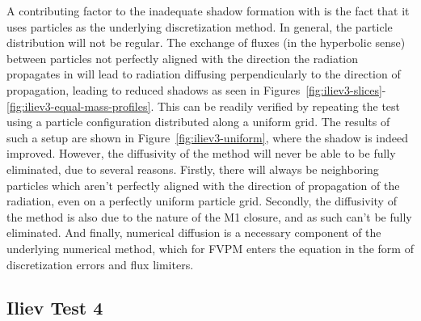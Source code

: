 A contributing factor to the inadequate shadow formation with \GEARRT is the fact that it uses
particles as the underlying discretization method. In general, the particle distribution will not be regular. The exchange of fluxes (in the hyperbolic sense) between particles not perfectly aligned with the direction the radiation propagates in will lead to radiation diffusing perpendicularly to the direction of propagation, leading to reduced shadows as seen in
Figures~\ref{fig:iliev3-slices}-\ref{fig:iliev3-equal-mass-profiles}. This can be readily verified by repeating the test using a particle configuration distributed along a uniform grid. The results of such a setup are shown in Figure~\ref{fig:iliev3-uniform}, where the shadow is indeed improved.
However, the diffusivity of the method will never be able to be fully eliminated, due to several
reasons. Firstly, there will always be neighboring particles which aren't perfectly aligned with
the direction of propagation of the radiation, even on a perfectly uniform particle grid. Secondly,
the diffusivity of the method is also due to the nature of the M1 closure, and as such can't be
fully eliminated. And finally, numerical diffusion is a necessary component of the underlying
numerical method, which for FVPM enters the equation in the form of discretization errors and flux
limiters.










\subsection{Iliev Test 4}\label{chap:Iliev4}


